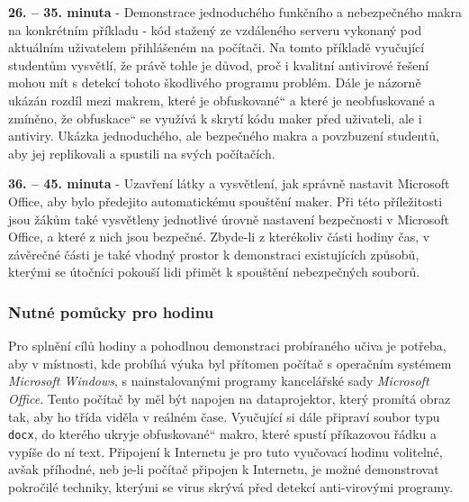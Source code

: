 \documentclass[a4paper, 12pt]{article}
\providecommand{\uv}[1]{\quotedblbase #1\textquotedblleft}
\begin{document}
\textbf{26. -- 35. minuta} - Demonstrace jednoduchého funkčního a nebezpečného makra na konkrétním příkladu - kód stažený ze vzdáleného serveru vykonaný pod aktuálním uživatelem přihlášeném na počítači. Na tomto příkladě vyučující studentům vysvětlí, že právě tohle je důvod, proč i kvalitní antivirové řešení mohou mít s detekcí tohoto škodlivého programu problém. Dále je názorně ukázán rozdíl mezi makrem, které je \uv{obfuskované} a které je neobfuskované a zmíněno, že \uv{obfuskace} se využívá k skrytí kódu maker před uživateli, ale i antiviry. Ukázka jednoduchého, ale bezpečného makra a povzbuzení studentů, aby jej replikovali a spustili na svých počítačích.

\textbf{36. -- 45. minuta} - Uzavření látky a vysvětlení, jak správně nastavit Microsoft Office, aby bylo předejito automatickému spouštění maker. Při této příležitosti jsou žákům také vysvětleny jednotlivé úrovně nastavení bezpečnosti v Microsoft Office, a které z nich jsou bezpečné. Zbyde-li z kterékoliv části hodiny čas, v závěrečné části je také vhodný prostor k demonstraci existujících způsobů, kterými se útočníci pokouší lidi přimět k spouštění nebezpečných souborů. 

\subsubsection{Nutné pomůcky pro hodinu}
Pro splnění cílů hodiny a pohodlnou demonstraci probíraného učiva je potřeba, aby v místnosti, kde probíhá výuka byl přítomen počítač s operačním systémem \textit{Microsoft Windows}, s nainstalovanými programy kancelářské sady \textit{Microsoft Office}. Tento počítač by měl být napojen na dataprojektor, který promítá obraz tak, aby ho třída viděla v reálném čase. Vyučující si dále připraví soubor typu \texttt{docx}, do kterého ukryje \uv{obfuskované} makro, které spustí příkazovou řádku a vypíše do ní text. Připojení k Internetu je pro tuto vyučovací hodinu volitelné, avšak příhodné, neb je-li počítač připojen k Internetu, je možné demonstrovat pokročilé techniky, kterými se virus skrývá před detekcí anti-virovými programy.

\newpage
\end{document}

